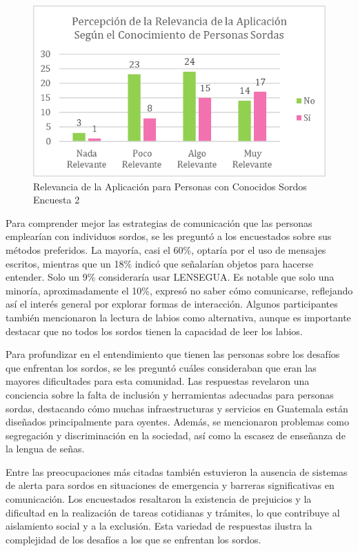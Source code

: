 \begin{figure} [H]
    \centering
    \includegraphics[width=0.5\linewidth]{figuras/relevancia_app_conocidos.png}
    \caption{Relevancia de la Aplicación para Personas con Conocidos Sordos Encuesta 2}
    \label{fig:enter-label}
\end{figure}

Para comprender mejor las estrategias de comunicación que las personas emplearían con individuos sordos, se les preguntó a los encuestados sobre sus métodos preferidos. La mayoría, casi el 60\%, optaría por el uso de mensajes escritos, mientras que un 18\% indicó que señalarían objetos para hacerse entender. Solo un 9\% consideraría usar LENSEGUA. Es notable que solo una minoría, aproximadamente el 10\%, expresó no saber cómo comunicarse, reflejando así el interés general por explorar formas de interacción. Algunos participantes también mencionaron la lectura de labios como alternativa, aunque es importante destacar que no todos los sordos tienen la capacidad de leer los labios.

Para profundizar en el entendimiento que tienen las personas sobre los desafíos que enfrentan los sordos, se les preguntó cuáles consideraban que eran las mayores dificultades para esta comunidad. Las respuestas revelaron una conciencia sobre la falta de inclusión y herramientas adecuadas para personas sordas, destacando cómo muchas infraestructuras y servicios en Guatemala están diseñados principalmente para oyentes. Además, se mencionaron problemas como segregación y discriminación en la sociedad, así como la escasez de enseñanza de la lengua de señas.

Entre las preocupaciones más citadas también estuvieron la ausencia de sistemas de alerta para sordos en situaciones de emergencia y barreras significativas en comunicación. Los encuestados resaltaron la existencia de prejuicios y la dificultad en la realización de tareas cotidianas y trámites, lo que contribuye al aislamiento social y a la exclusión. Esta variedad de respuestas ilustra la complejidad de los desafíos a los que se enfrentan los sordos. 

